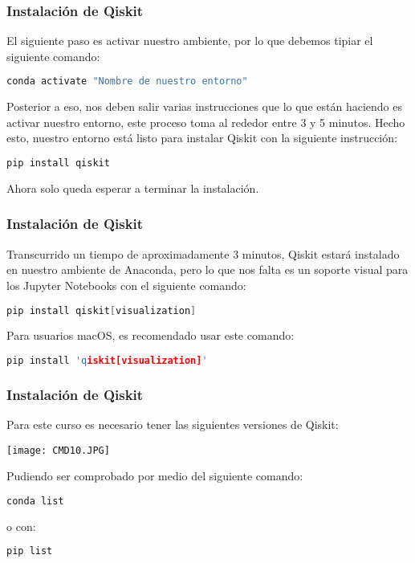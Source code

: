 \documentclass[spanish]{beamer}
\begin{document}
\begin{frame}[fragile]\frametitle{Instalación de Qiskit}
\justify\setlength{\parskip}{5mm}
El siguiente paso es activar nuestro ambiente, por lo que debemos tipiar el siguiente comando:
\begin{lstlisting}[language=c++]
conda activate "Nombre de nuestro entorno" \end{lstlisting}

Posterior a eso, nos deben salir varias instrucciones que lo que están haciendo es activar nuestro entorno, este proceso toma al rededor entre 3 y 5 minutos. Hecho esto, nuestro entorno está listo para instalar Qiskit con la siguiente instrucción:
\begin{lstlisting}[language=c++]
pip install qiskit \end{lstlisting}
Ahora solo queda esperar a terminar la instalación.
\end{frame}
\begin{frame}[fragile]\frametitle{Instalación de Qiskit}
\justify\setlength{\parskip}{5mm}
Transcurrido un tiempo de aproximadamente 3 minutos, Qiskit estará instalado en nuestro ambiente de Anaconda, pero lo que nos falta es un soporte visual para los Jupyter Notebooks con el siguiente comando:
\begin{lstlisting}[language=c++]
pip install qiskit[visualization] \end{lstlisting}

Para usuarios macOS, es recomendado usar este comando:
\begin{lstlisting}[language=c++]
pip install 'qiskit[visualization]'\end{lstlisting}
\end{frame}
\begin{frame}[fragile]\frametitle{Instalación de Qiskit}
\justify\setlength{\parskip}{5mm}
Para este curso es necesario tener las siguientes versiones de Qiskit:

\centering \texttt{[image: CMD10.JPG]}

Pudiendo ser comprobado por medio del siguiente comando:
\begin{lstlisting}[language=c++]
conda list\end{lstlisting}
 o con:
\begin{lstlisting}[language=c++]
pip list\end{lstlisting}
\end{frame}
\end{document}
